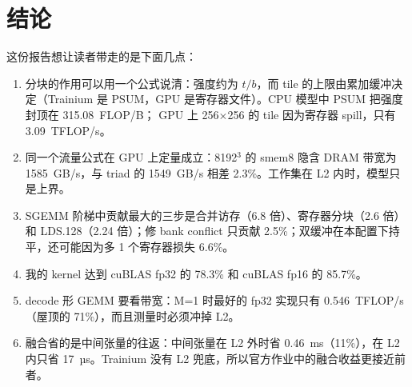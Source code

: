 \documentclass[11pt,a4paper]{ctexart}
\begin{document}
\section{结论}
这份报告想让读者带走的是下面几点：
\begin{enumerate}
  \item 分块的作用可以用一个公式说清：强度约为 $t/b$，而 tile 的上限由累加缓冲决定（Trainium 是 PSUM，GPU 是寄存器文件）。CPU 模型中 PSUM 把强度封顶在 315.08~FLOP/B；
        GPU 上 256$\times$256 的 tile 因为寄存器 spill，只有 3.09~TFLOP/s。
  \item 同一个流量公式在 GPU 上定量成立：8192$^3$ 的 smem8 隐含 DRAM 带宽为 1585~GB/s，与 triad 的 1549~GB/s 相差 2.3\%。工作集在 L2 内时，模型只是上界。
  \item SGEMM 阶梯中贡献最大的三步是合并访存（6.8 倍）、寄存器分块（2.6 倍）和 LDS.128（2.24 倍）；修 bank conflict 只贡献 2.5\%；双缓冲在本配置下持平，还可能因为多 1 个寄存器损失 6.6\%。
  \item 我的 kernel 达到 cuBLAS fp32 的 78.3\% 和 cuBLAS fp16 的 85.7\%。
  \item decode 形 GEMM 要看带宽：M=1 时最好的 fp32 实现只有 0.546~TFLOP/s（屋顶的 71\%），而且测量时必须冲掉 L2。
  \item 融合省的是中间张量的往返：中间张量在 L2 外时省 0.46~ms（11\%），在 L2 内只省 17~µs。Trainium 没有 L2 兜底，所以官方作业中的融合收益更接近前者。
\end{enumerate}
\end{document}
